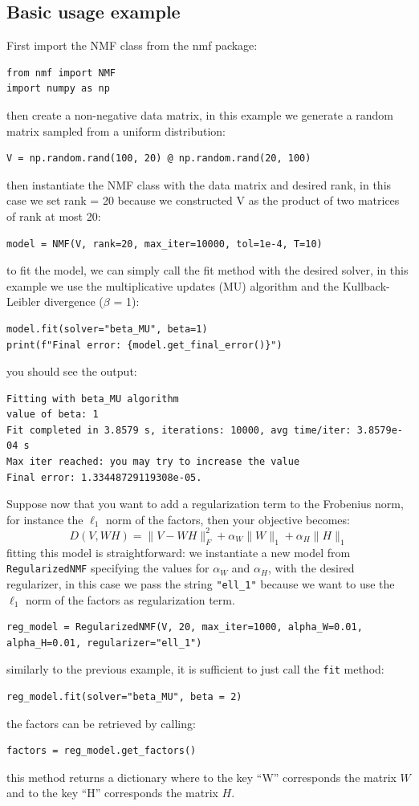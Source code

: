 \subsection{Basic usage example}
First import the NMF class from the nmf package:
\begin{lstlisting}
from nmf import NMF
import numpy as np
\end{lstlisting}
then create a non-negative data matrix, in this example we generate a random matrix sampled from a uniform distribution:
\begin{lstlisting}
V = np.random.rand(100, 20) @ np.random.rand(20, 100)
\end{lstlisting}
then instantiate the NMF class with the data matrix and desired rank, in this case we set rank = 20 because we constructed V as the product of two matrices of rank at most 20:
\begin{lstlisting}
model = NMF(V, rank=20, max_iter=10000, tol=1e-4, T=10)
\end{lstlisting}
to fit the model, we can simply call the fit method with the desired solver, in this example we use the multiplicative updates (MU) algorithm and the Kullback-Leibler divergence ($\beta$ = 1):
\begin{lstlisting}
model.fit(solver="beta_MU", beta=1)
print(f"Final error: {model.get_final_error()}")
\end{lstlisting}
you should see the output:
\begin{lstlisting}[style=terminal]
Fitting with beta_MU algorithm
value of beta: 1
Fit completed in 3.8579 s, iterations: 10000, avg time/iter: 3.8579e-04 s
Max iter reached: you may try to increase the value
Final error: 1.33448729119308e-05.
\end{lstlisting}
Suppose now that you want to add a regularization term to the Frobenius norm, for instance the $\ell_1$ norm of the factors, then your objective becomes:
\begin{equation*}
  D(V, WH) = \|V - WH\|_F^2 + \alpha_W \|W\|_1 + \alpha_H \|H\|_1
\end{equation*}
fitting this model is straightforward: we instantiate a new model from \texttt{RegularizedNMF} specifying the values for $\alpha_W$ and $\alpha_H$, with the desired regularizer, in this case we pass the string \texttt{"ell\_1"} because we want to use the $\ell_1$ norm of the factors as regularization term.
\begin{lstlisting}
reg_model = RegularizedNMF(V, 20, max_iter=1000, alpha_W=0.01, alpha_H=0.01, regularizer="ell_1")  
\end{lstlisting}
similarly to the previous example, it is sufficient to just call the \texttt{fit} method:
\begin{lstlisting}
reg_model.fit(solver="beta_MU", beta = 2)
\end{lstlisting}
the factors can be retrieved by calling:
\begin{lstlisting}
factors = reg_model.get_factors()
\end{lstlisting}
this method returns a dictionary where to the key ``W'' corresponds the matrix $W$ and to the key ``H'' corresponds the matrix $H$.
